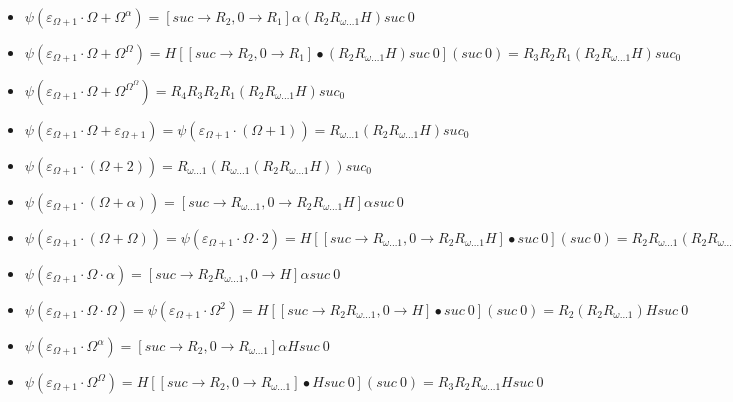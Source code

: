 \documentclass[10pt]{article}
\begin{document}
\begin{itemize}
\item \( \psi(\varepsilon_{\Omega+1} \cdot \Omega+\Omega^\alpha) = [suc \rightarrow R_2, 0 \rightarrow R_1] \alpha (R_2 R_{\omega \ldots 1} H) suc\ 0 \)

\item \( \psi(\varepsilon_{\Omega+1} \cdot \Omega+\Omega^\Omega) = H [[suc \rightarrow R_2, 0 \rightarrow R_1] \bullet (R_2 R_{\omega \ldots 1} H) suc\ 0] (suc\ 0) = R_3 R_2 R_1 (R_2 R_{\omega \ldots 1} H) suc_ 0 \)

\item \( \psi(\varepsilon_{\Omega+1} \cdot \Omega+\Omega^{\Omega^\Omega}) = R_4 R_3 R_2 R_1 (R_2 R_{\omega \ldots 1} H) suc_ 0 \)

\item \( \psi(\varepsilon_{\Omega+1} \cdot \Omega+\varepsilon_{\Omega+1}) = \psi(\varepsilon_{\Omega+1} \cdot (\Omega+1)) = R_{\omega \ldots 1} (R_2 R_{\omega \ldots 1} H) suc_ 0 \)

\item \( \psi(\varepsilon_{\Omega+1} \cdot (\Omega+2)) = R_{\omega \ldots 1} (R_{\omega \ldots 1} (R_2 R_{\omega \ldots 1} H)) suc_ 0 \)

\item \( \psi(\varepsilon_{\Omega+1} \cdot (\Omega+\alpha)) = [suc \rightarrow R_{\omega \ldots 1}, 0 \rightarrow R_2 R_{\omega \ldots 1} H] \alpha suc\ 0 \)

\item \( \psi(\varepsilon_{\Omega+1} \cdot (\Omega+\Omega)) = \psi(\varepsilon_{\Omega+1} \cdot \Omega \cdot 2) = H [[suc \rightarrow R_{\omega \ldots 1}, 0 \rightarrow R_2 R_{\omega \ldots 1} H] \bullet suc\ 0] (suc\ 0) = R_2 R_{\omega \ldots 1} (R_2 R_{\omega \ldots 1} H) suc\ 0 \)

\item \( \psi(\varepsilon_{\Omega+1} \cdot \Omega \cdot \alpha) = [suc \rightarrow R_2 R_{\omega \ldots 1}, 0 \rightarrow  H] \alpha suc\ 0 \)

\item \( \psi(\varepsilon_{\Omega+1} \cdot \Omega \cdot \Omega) = \psi(\varepsilon_{\Omega+1} \cdot \Omega^2) = H [[suc \rightarrow R_2 R_{\omega \ldots 1}, 0 \rightarrow  H] \bullet suc\ 0] (suc\ 0) = R_2 (R_2 R_{\omega \ldots 1}) H suc\ 0 \)

\item \( \psi(\varepsilon_{\Omega+1} \cdot \Omega^\alpha) = [suc \rightarrow R_2, 0 \rightarrow R_{\omega \ldots 1}] \alpha H suc\ 0 \)

\item \( \psi(\varepsilon_{\Omega+1} \cdot \Omega^\Omega) = H [[suc \rightarrow R_2, 0 \rightarrow R_{\omega \ldots 1}] \bullet H suc\ 0] (suc\ 0) = R_3 R_2 R_{\omega \ldots 1} H suc\ 0 \)


\end{itemize}
\end{document}
